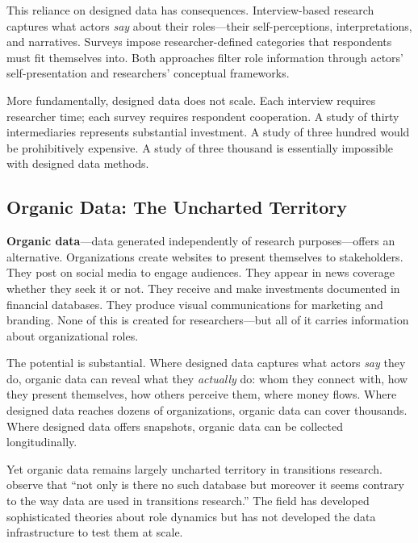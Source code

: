 \documentclass[../main.tex]{subfiles}
\begin{document}
This reliance on designed data has consequences. Interview-based research captures what actors \emph{say} about their roles---their self-perceptions, interpretations, and narratives. Surveys impose researcher-defined categories that respondents must fit themselves into. Both approaches filter role information through actors' self-presentation and researchers' conceptual frameworks.

More fundamentally, designed data does not scale. Each interview requires researcher time; each survey requires respondent cooperation. A study of thirty intermediaries represents substantial investment. A study of three hundred would be prohibitively expensive. A study of three thousand is essentially impossible with designed data methods.

\subsection{Organic Data: The Uncharted Territory}

\textbf{Organic data}---data generated independently of research purposes---offers an alternative. Organizations create websites to present themselves to stakeholders. They post on social media to engage audiences. They appear in news coverage whether they seek it or not. They receive and make investments documented in financial databases. They produce visual communications for marketing and branding. None of this is created for researchers---but all of it carries information about organizational roles.

The potential is substantial. Where designed data captures what actors \emph{say} they do, organic data can reveal what they \emph{actually} do: whom they connect with, how they present themselves, how others perceive them, where money flows. Where designed data reaches dozens of organizations, organic data can cover thousands. Where designed data offers snapshots, organic data can be collected longitudinally.

Yet organic data remains largely uncharted territory in transitions research. \textcite{dehaan2019datadriven} observe that ``not only is there no such database but moreover it seems contrary to the way data are used in transitions research.'' The field has developed sophisticated theories about role dynamics but has not developed the data infrastructure to test them at scale.
\end{document}
